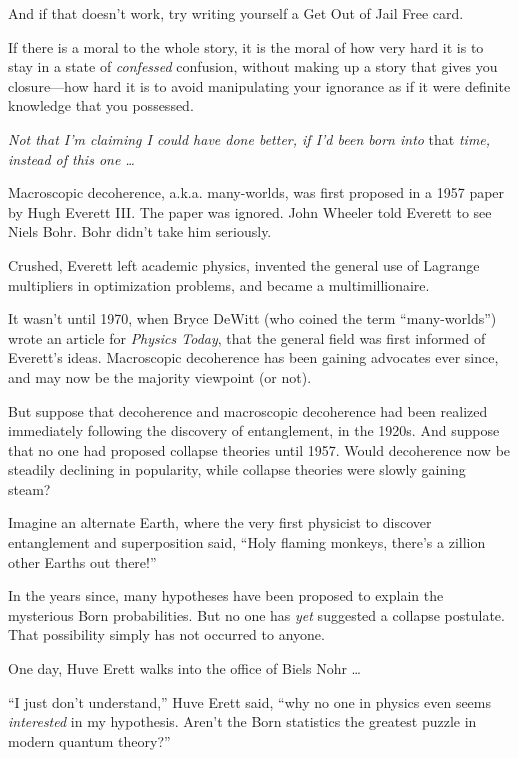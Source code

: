 {
 And if that doesn't work, try writing yourself a
Get Out of Jail Free card.}

{
 If there is a moral to the whole story, it is the moral of how
very hard it is to stay in a state of \textit{confessed} confusion,
without making up a story that gives you closure---how hard it is to
avoid manipulating your ignorance as if it were definite knowledge that
you possessed.}

\myendsectiontext


{
 \textit{Not that I'm claiming I could have done
better, if I'd been born into} that \textit{time,
instead of this one \ldots} }

{
 Macroscopic decoherence, a.k.a. many-worlds, was first proposed in
a 1957 paper by Hugh Everett III. The paper was ignored. John Wheeler
told Everett to see Niels Bohr. Bohr didn't take him
seriously.}

{
 Crushed, Everett left academic physics, invented the general use
of Lagrange multipliers in optimization problems, and became a
multimillionaire.}

{
 It wasn't until 1970, when Bryce DeWitt (who
coined the term ``many-worlds'')
wrote an article for \textit{Physics Today}, that the general field was
first informed of Everett's ideas. Macroscopic
decoherence has been gaining advocates ever since, and may now be the
majority viewpoint (or not).}

{
 But suppose that decoherence and macroscopic decoherence had been
realized immediately following the discovery of entanglement, in the
1920s. And suppose that no one had proposed collapse theories until
1957. Would decoherence now be steadily declining in popularity, while
collapse theories were slowly gaining steam?}

{
 Imagine an alternate Earth, where the very first physicist to
discover entanglement and superposition said, ``Holy
flaming monkeys, there's a zillion other Earths out
there!''}

{
 In the years since, many hypotheses have been proposed to explain
the mysterious Born probabilities. But no one has \textit{yet}
suggested a collapse postulate. That possibility simply has not
occurred to anyone.}

{
 One day, Huve Erett walks into the office of Biels Nohr \ldots}

{
 ``I just don't
understand,'' Huve Erett said, ``why
no one in physics even seems \textit{interested} in my hypothesis.
Aren't the Born statistics the greatest puzzle in
modern quantum theory?''}

